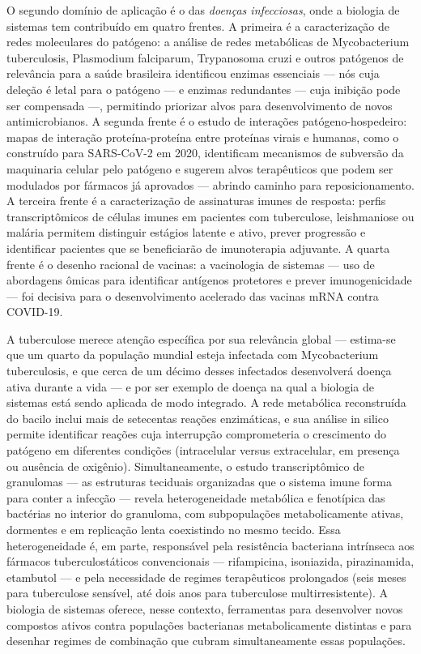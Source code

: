 O segundo domínio de aplicação é o das \emph{doenças infecciosas}, onde a biologia de sistemas tem contribuído em quatro frentes. A primeira é a caracterização de redes moleculares do patógeno: a análise de redes metabólicas de Mycobacterium tuberculosis, Plasmodium falciparum, Trypanosoma cruzi e outros patógenos de relevância para a saúde brasileira identificou enzimas essenciais --- nós cuja deleção é letal para o patógeno --- e enzimas redundantes --- cuja inibição pode ser compensada ---, permitindo priorizar alvos para desenvolvimento de novos antimicrobianos. A segunda frente é o estudo de interações patógeno-hospedeiro: mapas de interação proteína-proteína entre proteínas virais e humanas, como o construído para SARS-CoV-2 em 2020, identificam mecanismos de subversão da maquinaria celular pelo patógeno e sugerem alvos terapêuticos que podem ser modulados por fármacos já aprovados --- abrindo caminho para reposicionamento. A terceira frente é a caracterização de assinaturas imunes de resposta: perfis transcriptômicos de células imunes em pacientes com tuberculose, leishmaniose ou malária permitem distinguir estágios latente e ativo, prever progressão e identificar pacientes que se beneficiarão de imunoterapia adjuvante. A quarta frente é o desenho racional de vacinas: a vacinologia de sistemas --- uso de abordagens ômicas para identificar antígenos protetores e prever imunogenicidade --- foi decisiva para o desenvolvimento acelerado das vacinas mRNA contra COVID-19.

A tuberculose merece atenção específica por sua relevância global --- estima-se que um quarto da população mundial esteja infectada com Mycobacterium tuberculosis, e que cerca de um décimo desses infectados desenvolverá doença ativa durante a vida --- e por ser exemplo de doença na qual a biologia de sistemas está sendo aplicada de modo integrado. A rede metabólica reconstruída do bacilo inclui mais de setecentas reações enzimáticas, e sua análise in silico permite identificar reações cuja interrupção comprometeria o crescimento do patógeno em diferentes condições (intracelular versus extracelular, em presença ou ausência de oxigênio). Simultaneamente, o estudo transcriptômico de granulomas --- as estruturas teciduais organizadas que o sistema imune forma para conter a infecção --- revela heterogeneidade metabólica e fenotípica das bactérias no interior do granuloma, com subpopulações metabolicamente ativas, dormentes e em replicação lenta coexistindo no mesmo tecido. Essa heterogeneidade é, em parte, responsável pela resistência bacteriana intrínseca aos fármacos tuberculostáticos convencionais --- rifampicina, isoniazida, pirazinamida, etambutol --- e pela necessidade de regimes terapêuticos prolongados (seis meses para tuberculose sensível, até dois anos para tuberculose multirresistente). A biologia de sistemas oferece, nesse contexto, ferramentas para desenvolver novos compostos ativos contra populações bacterianas metabolicamente distintas e para desenhar regimes de combinação que cubram simultaneamente essas populações.


